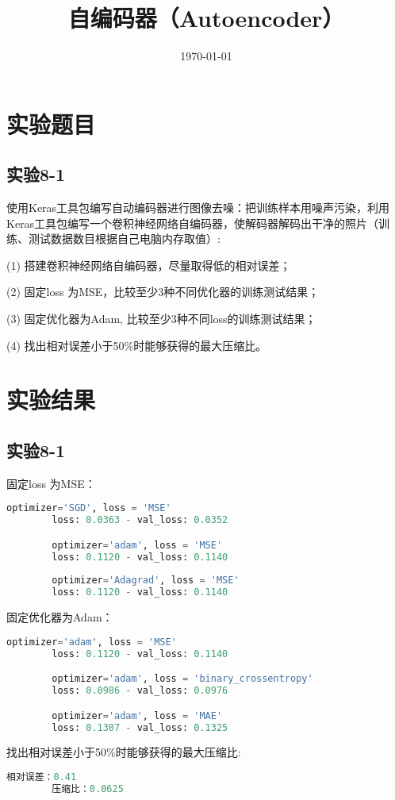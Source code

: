 \documentclass{../source/Experiment}
\title{自编码器（Autoencoder）}
\date{\today}
\begin{document}
    \makecover
    \section{实验题目}
        \subsection{实验8-1}
        使用Keras工具包编写自动编码器进行图像去噪：把训练样本用噪声污染，利用Keras工具包编写一个卷积神经网络自编码器，使解码器解码出干净的照片（训练、测试数据数目根据自己电脑内存取值）:

        (1)  搭建卷积神经网络自编码器，尽量取得低的相对误差；

        (2)  固定loss 为MSE，比较至少3种不同优化器的训练测试结果；

        (3)  固定优化器为Adam, 比较至少3种不同loss的训练测试结果；

        (4)  找出相对误差小于50\%时能够获得的最大压缩比。

    \section{实验结果}
        \subsection{实验8-1}
        
        固定loss 为MSE：

        \begin{lstlisting}[language = python]
        optimizer='SGD', loss = 'MSE'
        loss: 0.0363 - val_loss: 0.0352

        optimizer='adam', loss = 'MSE'
        loss: 0.1120 - val_loss: 0.1140
            
        optimizer='Adagrad', loss = 'MSE'
        loss: 0.1120 - val_loss: 0.1140
        \end{lstlisting}

        固定优化器为Adam：

        \begin{lstlisting}[language = python]
        optimizer='adam', loss = 'MSE'
        loss: 0.1120 - val_loss: 0.1140

        optimizer='adam', loss = 'binary_crossentropy'
        loss: 0.0986 - val_loss: 0.0976

        optimizer='adam', loss = 'MAE'
        loss: 0.1307 - val_loss: 0.1325
        \end{lstlisting}

        找出相对误差小于50\%时能够获得的最大压缩比:
        \begin{lstlisting}[language = python]
        相对误差：0.41
        压缩比：0.0625
        \end{lstlisting}
\end{document}

